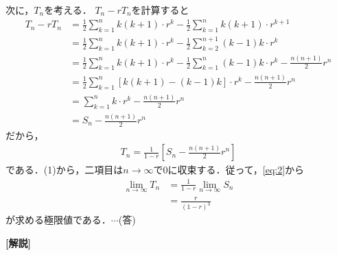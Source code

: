 \documentclass[a4paper,10pt]{ltjsarticle}
\begin{document}
\begin{multicols}{2}
  \vspace{10pt}
  次に，$T_n$を考える．
  $T_n-rT_n$を計算すると
  \begin{align*}
    T_n -rT_n
     & = \frac{1}{2}\sum_{k=1}^n k(k+1) \cdot r^k - \frac{1}{2}\sum_{k=1}^n k(k+1) \cdot r^{k+1}                       \\
     & = \frac{1}{2}\sum_{k=1}^n k(k+1) \cdot r^k - \frac{1}{2}\sum_{k=2}^{n+1} (k-1)k \cdot r^{k}                     \\
     & = \frac{1}{2}\sum_{k=1}^n k(k+1) \cdot r^k - \frac{1}{2}\sum_{k=1}^{n} (k-1)k \cdot r^{k} - \frac{n(n+1)}{2}r^n \\
     & = \frac{1}{2}\sum_{k=1}^n \left[k(k+1)- (k-1)k \right] \cdot r^k - \frac{n(n+1)}{2}r^n                          \\
     & = \sum_{k=1}^n k \cdot r^k - \frac{n(n+1)}{2}r^n                                                                \\
     & = S_n - \frac{n(n+1)}{2}r^n
  \end{align*}
  だから，
  \begin{align*}
    T_n = \frac{1}{1-r}\left[ S_n - \frac{n(n+1)}{2}r^n  \right]
  \end{align*}
  である．(1)から，二項目は$n\to\infty$で$0$に収束する．従って，\cref{eq:2}から
  \begin{align*}
    \lim_{n\to\infty}T_n
     & = \frac{1}{1-r}\lim_{n\to\infty}S_n \\
     & = \frac{r}{(1-r)^3}
  \end{align*}
  が求める極限値である．$\cdots$(答)

  \vspace{10pt}
  {\bf[解説]}

  \newpage
\end{multicols}
\end{document}
